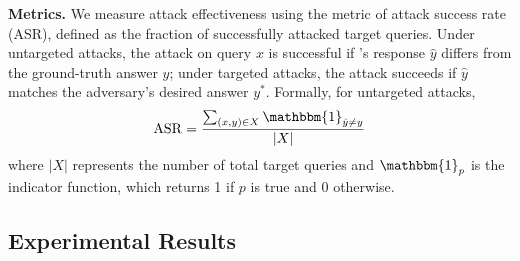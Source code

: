 \vspace{2pt}
{\bf Metrics.} We measure attack effectiveness using the metric of attack success rate (ASR), defined as the fraction of successfully attacked target queries. Under untargeted attacks, the attack on query $x$ is successful if \rag's response $\hat{y}$ differs from the ground-truth answer $y$; under targeted attacks, the attack succeeds if $\hat{y}$ matches the adversary's desired answer $y^*$. Formally, for untargeted attacks,
\begin{equation}
\label{eq:asr}
\mathrm{ASR} = \frac{\sum_{(x, y) \in X} \mathbbm{1}_{\hat{y} \neq y}}{|X|}
\end{equation}
where $|X|$ represents the number of total target queries and  $\mathbbm{1}_p$ is the indicator function, which returns 1 if $p$ is true and 0 otherwise. 


\subsection{Experimental Results}


    



